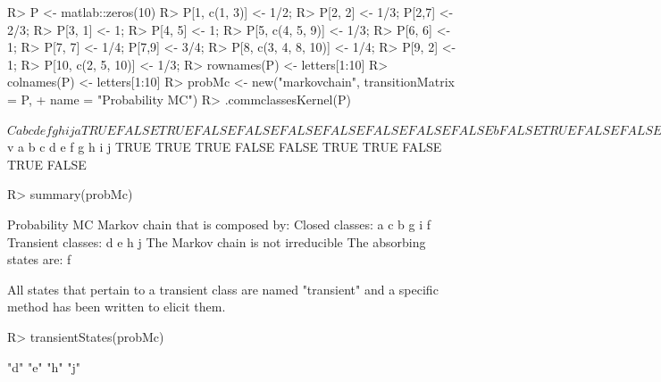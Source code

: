 \documentclass[nojss]{jss}
\begin{document}
\begin{Schunk}
\begin{Sinput}
R> P <- matlab::zeros(10)
R> P[1, c(1, 3)] <- 1/2;
R> P[2, 2] <- 1/3; P[2,7] <- 2/3;
R> P[3, 1] <- 1;
R> P[4, 5] <- 1;
R> P[5, c(4, 5, 9)] <- 1/3;
R> P[6, 6] <- 1;
R> P[7, 7] <- 1/4; P[7,9] <- 3/4;
R> P[8, c(3, 4, 8, 10)] <- 1/4;
R> P[9, 2] <- 1;
R> P[10, c(2, 5, 10)] <- 1/3;
R> rownames(P) <- letters[1:10] 
R> colnames(P) <- letters[1:10]
R> probMc <- new("markovchain", transitionMatrix = P, 
+                name = "Probability MC")
R> .commclassesKernel(P)
\end{Sinput}
\begin{Soutput}
$C
      a     b     c     d     e     f     g     h     i     j
a  TRUE FALSE  TRUE FALSE FALSE FALSE FALSE FALSE FALSE FALSE
b FALSE  TRUE FALSE FALSE FALSE FALSE  TRUE FALSE  TRUE FALSE
c  TRUE FALSE  TRUE FALSE FALSE FALSE FALSE FALSE FALSE FALSE
d FALSE FALSE FALSE  TRUE  TRUE FALSE FALSE FALSE FALSE FALSE
e FALSE FALSE FALSE  TRUE  TRUE FALSE FALSE FALSE FALSE FALSE
f FALSE FALSE FALSE FALSE FALSE  TRUE FALSE FALSE FALSE FALSE
g FALSE  TRUE FALSE FALSE FALSE FALSE  TRUE FALSE  TRUE FALSE
h FALSE FALSE FALSE FALSE FALSE FALSE FALSE  TRUE FALSE FALSE
i FALSE  TRUE FALSE FALSE FALSE FALSE  TRUE FALSE  TRUE FALSE
j FALSE FALSE FALSE FALSE FALSE FALSE FALSE FALSE FALSE  TRUE

$v
    a     b     c     d     e     f     g     h     i     j 
 TRUE  TRUE  TRUE FALSE FALSE  TRUE  TRUE FALSE  TRUE FALSE 
\end{Soutput}
\begin{Sinput}
R> summary(probMc)
\end{Sinput}
\begin{Soutput}
Probability MC  Markov chain that is composed by: 
Closed classes: 
a c 
b g i 
f 
Transient classes: 
d e 
h 
j 
The Markov chain is not irreducible 
The absorbing states are: f
\end{Soutput}
\end{Schunk}

All states that pertain to a transient class are named "transient" and a
specific method has been written to elicit them.


\begin{Schunk}
\begin{Sinput}
R> transientStates(probMc)
\end{Sinput}
\begin{Soutput}
[1] "d" "e" "h" "j"
\end{Soutput}
\end{Schunk}
\end{document}
